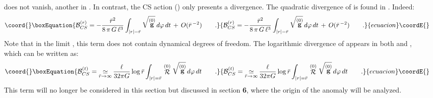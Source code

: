 \documentclass[a4paper,10pt]{article}
\begin{document}
does not vanish,  
another in \coordHE{}. In contrast, the CS action (\myHighlight{$\ref{SCS}$}\coordHE{})  
only presents a  \coordHE{} divergence. The quadratic divergence of  
\coordHE{} 
is found in 
\coordHE{}. Indeed: 
\begin{equation}\coord{}\boxEquation{ 
\label{rbound} 
{\cal B}_{CS}^{(r)} = - \frac {\bar r^2} {8  \, \pi \, G \, \ell^3} 
\int_{|r|=\bar r} \sqrt{\stackrel {(0)} {\bf g}}  \, d\varphi \, dt 
 \, + \, O(\bar r^{\, -2})  
\qquad . 
}{ 
{\cal B}_{CS}^{(r)} = - \frac {\bar r^2} {8  \, \pi \, G \, \ell^3} 
\int_{|r|=\bar r} \sqrt{\stackrel {(0)} {\bf g}}  \, d\varphi \, dt 
 \, + \, O(\bar r^{\, -2})  
\qquad . 
}{ecuacion}\coordE{}\end{equation} 
Note that in the limit \coordHE{}, this term  
does not contain dynamical degrees of freedom.  
The logarithmic divergence of \coordHE{} appears in both \coordHE{} and 
\coordHE{}, which can be written as: 
\begin{equation}\coord{}\boxEquation{ 
\label{BCS2} 
{\cal B}_{CS}^{(t)} = 
\asym   
 \frac \ell {32 \pi G} 
\log \bar r 
\int_{|r|=\bar r}  \stackrel {(0)} {\cal R}  
 \sqrt{\stackrel {(0)} {\bf g}}  \, d\varphi \, dt \qquad . 
}{ 
{\cal B}_{CS}^{(t)} = 
\asym   
 \frac \ell {32 \pi G} 
\log \bar r 
\int_{|r|=\bar r}  \stackrel {(0)} {\cal R}  
 \sqrt{\stackrel {(0)} {\bf g}}  \, d\varphi \, dt \qquad . 
}{ecuacion}\coordE{}\end{equation} 
This term will no longer be considered in this section but discussed  
in section {\bf 6}, where the origin of the anomaly will be analyzed. 
 
\end{document}
